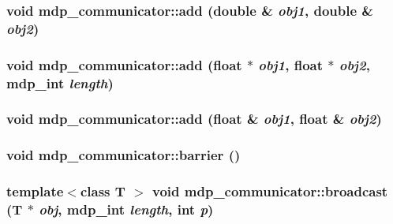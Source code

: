 \hypertarget{classmdp__communicator_a6386050a1fa9b536ab8eae4bc922fbad}{
\subsubsection[{add}]{\setlength{\rightskip}{0pt plus 5cm}void mdp\_\-communicator::add (double \& {\em obj1}, \/  double \& {\em obj2})}}
\label{classmdp__communicator_a6386050a1fa9b536ab8eae4bc922fbad}
\hypertarget{classmdp__communicator_aba7a8da3cb9ef8f8fe782864fdfb4e48}{
\subsubsection[{add}]{\setlength{\rightskip}{0pt plus 5cm}void mdp\_\-communicator::add (float $\ast$ {\em obj1}, \/  float $\ast$ {\em obj2}, \/  {\bf mdp\_\-int} {\em length})}}
\label{classmdp__communicator_aba7a8da3cb9ef8f8fe782864fdfb4e48}
\hypertarget{classmdp__communicator_a59576e470c0eb7c0b5faa177cc90c54b}{
\subsubsection[{add}]{\setlength{\rightskip}{0pt plus 5cm}void mdp\_\-communicator::add (float \& {\em obj1}, \/  float \& {\em obj2})}}
\label{classmdp__communicator_a59576e470c0eb7c0b5faa177cc90c54b}
\hypertarget{classmdp__communicator_a46a0990eb357e60a6768c706a2aaf272}{
\subsubsection[{barrier}]{\setlength{\rightskip}{0pt plus 5cm}void mdp\_\-communicator::barrier ()}}
\label{classmdp__communicator_a46a0990eb357e60a6768c706a2aaf272}
\hypertarget{classmdp__communicator_ac735496a3b58e01cc8a7b5b76591f5c2}{
\subsubsection[{broadcast}]{\setlength{\rightskip}{0pt plus 5cm}template$<$class T $>$ void mdp\_\-communicator::broadcast (T $\ast$ {\em obj}, \/  {\bf mdp\_\-int} {\em length}, \/  int {\em p})}}
